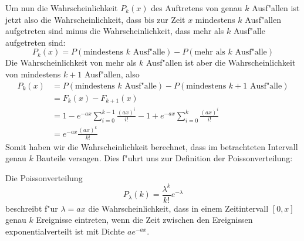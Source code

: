 Um nun die Wahrscheinlichkeit $P_k(x)$ des Auftretens von genau $k$ Ausf"allen
ist jetzt also die Wahrscheinlichkeit, dass bis zur Zeit $x$ mindestens
$k$ Ausf"allen aufgetreten sind minus die Wahrscheinlichkeit, dass mehr
als $k$ Ausf"alle aufgetreten sind: 
\[
P_k(x)=P(\text{mindestens $k$ Ausf"alle})-P(\text{mehr als $k$ Ausf"alle})
\]
Die Wahrscheinlichkeit von mehr als $k$ Ausf"allen ist aber die Wahrscheinlichkeit
von mindestens $k+1$ Ausf"allen, also
\begin{align*}
P_k(x)
&=P(\text{mindestens $k$ Ausf"alle})-P(\text{mindestens $k+1$ Ausf"alle})\\
&=F_k(x)-F_{k+1}(x)\\
&=1-e^{-ax}\sum_{i=0}^{k-1}\frac{(ax)^i}{i!}-1+e^{-ax}\sum_{i=0}^{k}\frac{(ax)^i}{i!}\\
&=e^{-ax}\frac{(ax)^k}{k!}
\end{align*}
Somit haben wir die Wahrscheinlichkeit berechnet, dass im betrachteten
Intervall genau $k$ Bauteile versagen.
Dies f"uhrt uns zur Definition der Poissonverteilung:
\begin{definition} Die Poissonverteilung
\[
P_\lambda(k)=\frac{\lambda^k}{k!}e^{-\lambda}
\]
beschreibt f"ur $\lambda=ax$ die Wahrscheinlichkeit,
dass in einem Zeitintervall $[0,x]$ genau $k$ Ereignisse eintreten, wenn
die Zeit zwischen den Ereignissen exponentialverteilt ist mit Dichte
$ae^{-ax}$.
\end{definition}

